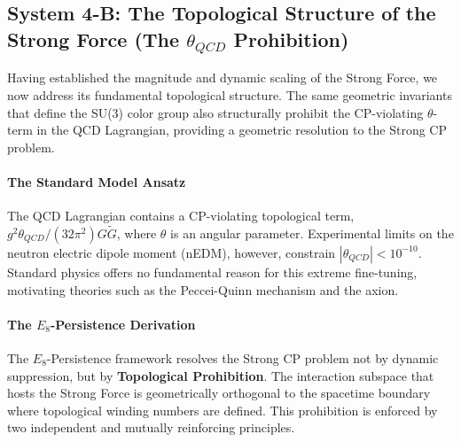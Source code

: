 \subsection{System 4-B: The Topological Structure of the Strong Force (The \texorpdfstring{$\theta_{QCD}$}{thetaQCD} Prohibition)}
\label{sec:StrongCP}

Having established the magnitude and dynamic scaling of the Strong Force, we now address its fundamental topological structure. The same geometric invariants that define the SU(3) color group also structurally prohibit the CP-violating $\theta$-term in the QCD Lagrangian, providing a geometric resolution to the Strong CP problem.

\paragraph{The Standard Model Ansatz}
The QCD Lagrangian contains a CP-violating topological term, $g^2\theta_{QCD}/(32\pi^2) G\tilde{G}$, where $\theta$ is an angular parameter. Experimental limits on the neutron electric dipole moment (nEDM), however, constrain $|\theta_{QCD}| < 10^{-10}$. Standard physics offers no fundamental reason for this extreme fine-tuning, motivating theories such as the Peccei-Quinn mechanism and the axion.

\paragraph{The $E_8$-Persistence Derivation}
The $E_8$-Persistence framework resolves the Strong CP problem not by dynamic suppression, but by \textbf{Topological Prohibition}. The interaction subspace that hosts the Strong Force is geometrically orthogonal to the spacetime boundary where topological winding numbers are defined. This prohibition is enforced by two independent and mutually reinforcing principles.

